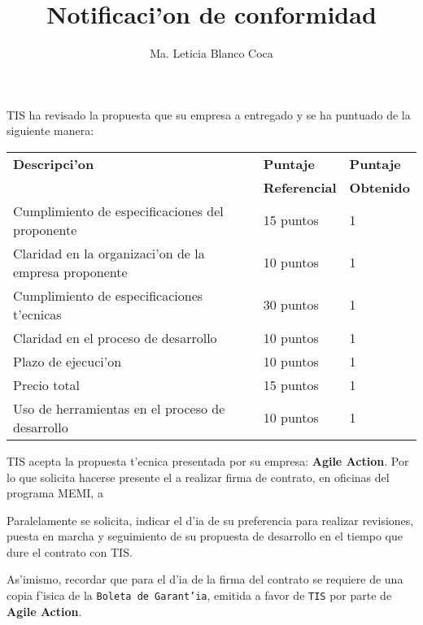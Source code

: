 \documentclass[10pt,letterpaper,twoside]{article}
\newcommand{\empresa}[0]{\textbf{Agile Action}}
\newcommand{\pp}[0]{1}
\newcommand{\sep}[0]{1}
\newcommand{\tp}[0]{1}
\newcommand{\cp}[0]{1}
\newcommand{\qp}[0]{1}
\newcommand{\ssp}[0]{1}
\newcommand{\sssp}[0]{1}
\begin{document}
\title{Notificaci'on de conformidad}
\author{Ma. Leticia Blanco Coca}
\maketitle

TIS ha revisado la propuesta que su empresa a entregado y se ha puntuado de la siguiente manera:

\begin{tabular}{|l|l|l|}
\hline \textbf{Descripci'on}& \textbf{Puntaje}&\textbf{Puntaje} \\
& \textbf{Referencial}&\textbf{Obtenido} \\
\hline
\hline Cumplimiento de especificaciones del proponente       & 15 puntos & \pp \\
\hline Claridad en la organizaci'on de la empresa proponente & 10 puntos & \sep \\
\hline Cumplimiento de especificaciones t'ecnicas            & 30 puntos & \tp \\ 
\hline Claridad en el proceso de desarrollo                  & 10 puntos & \cp\\
\hline Plazo de ejecuci'on                                   & 10 puntos & \qp \\
\hline Precio total                                          & 15 puntos & \ssp \\
\hline Uso de herramientas en el proceso de desarrollo       & 10 puntos & \sssp \\
\hline
\end{tabular}

TIS acepta la propuesta t'ecnica presentada por su empresa: \empresa. Por lo que solicita 
hacerse presente el \dia a realizar firma de contrato,
en oficinas del programa MEMI, a \hora

Paralelamente se solicita, indicar el d'ia de su preferencia para realizar revisiones, puesta
en marcha  y 
seguimiento de su propuesta de desarrollo en el tiempo que dure el contrato con TIS.


As'imismo, recordar que para el d'ia de la firma del contrato se requiere de una copia f'isica
 de la 
\texttt{Boleta de Garant'ia}, emitida a favor de \texttt{TIS} por parte de \empresa.
\end{document}
